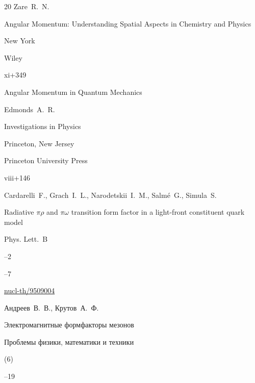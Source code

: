 \begin{thebibliography}{20}
\by Zare~R.~N.

\book Angular Momentum: Understanding Spatial Aspects in Chemistry and Physics

\publaddr New York

\publ Wiley


\totalpages xi+349




\book  Angular Momentum in Quantum Mechanics


\by Edmonds~A.~R.


\serial Investigations in Physics

\publaddr  Princeton, New Jersey

\publ Princeton University Press 

\totalpages viii+146 





\by  Cardarelli~F., Grach~I.~L., Narodetskii~I.~M., Salm\'e~G., Simula~S.

\paper    Radiative $\pi\rho$ and $\pi\omega$ transition form factor in a light-front constituent quark model

\jour Phys. Lett.~B



--2

--7


\arxiv \href{http://arxiv.org/abs/nucl-th/9509004}{nucl-th/9509004}




\by  Андреев~В.~В., Крутов~А.~Ф.

\paper    Электромагнитные формфакторы мезонов

\jour Проблемы физики, математики и техники


(6)

--19






\end{thebibliography}
